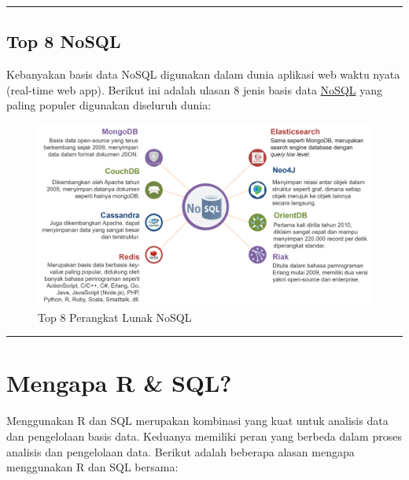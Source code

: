 \documentclass[
]{book}
\begin{document}
\begin{center}\rule{0.5\linewidth}{0.5pt}\end{center}

\hypertarget{top-8-nosql}{%
\subsection{Top 8 NoSQL}\label{top-8-nosql}}

Kebanyakan basis data NoSQL digunakan dalam dunia aplikasi web waktu nyata (real-time web app). Berikut ini adalah ulasan 8 jenis basis data \href{https://www.codepolitan.com/7-basis-data-nosql-populer}{NoSQL} yang paling populer digunakan diseluruh dunia:

\begin{figure}

{\centering \includegraphics[width=1\linewidth]{./images/Bab1/8NoSQL_DB} 

}

\caption{Top 8 Perangkat Lunak NoSQL}\label{fig:top8noSQL}
\end{figure}

\begin{center}\rule{0.5\linewidth}{0.5pt}\end{center}

\hypertarget{mengapa-r-sql}{%
\section{Mengapa R \& SQL?}\label{mengapa-r-sql}}

Menggunakan R dan SQL merupakan kombinasi yang kuat untuk analisis data dan pengelolaan basis data. Keduanya memiliki peran yang berbeda dalam proses analisis dan pengelolaan data. Berikut adalah beberapa alasan mengapa menggunakan R dan SQL bersama:
\end{document}
